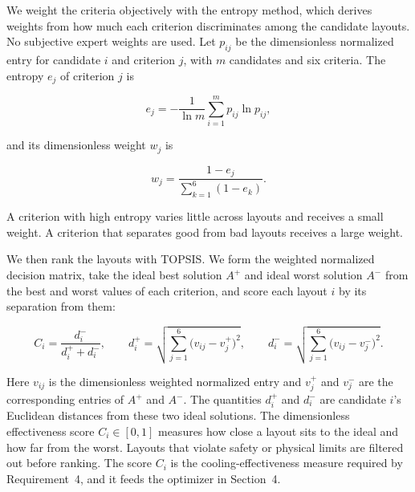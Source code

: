 \documentclass[11pt]{article}
\begin{document}
We weight the criteria objectively with the entropy method, which derives weights
from how much each criterion discriminates among the candidate layouts. No
subjective expert weights are used. Let $p_{ij}$ be the dimensionless normalized
entry for candidate $i$ and criterion $j$, with $m$ candidates and six criteria.
The entropy $e_j$ of criterion $j$ is

\begin{equation}
e_j = -\frac{1}{\ln m}\sum_{i=1}^{m} p_{ij}\ln p_{ij},
\label{eq:entropy}
\end{equation}

and its dimensionless weight $w_j$ is

\begin{equation}
w_j = \frac{1-e_j}{\sum_{k=1}^{6}(1-e_k)}.
\label{eq:weight}
\end{equation}

A criterion with high entropy varies little across layouts and receives a small
weight. A criterion that separates good from bad layouts receives a large weight.

We then rank the layouts with TOPSIS. We form the weighted normalized decision
matrix, take the ideal best solution $A^{+}$ and ideal worst solution $A^{-}$
from the best and worst values of each criterion, and score each layout $i$ by
its separation from them:

\begin{equation}
C_i = \frac{d_i^{-}}{d_i^{+}+d_i^{-}},
\qquad
d_i^{+}=\sqrt{\sum_{j=1}^{6}\bigl(v_{ij}-v_j^{+}\bigr)^2},
\qquad
d_i^{-}=\sqrt{\sum_{j=1}^{6}\bigl(v_{ij}-v_j^{-}\bigr)^2}.
\label{eq:topsis}
\end{equation}

Here $v_{ij}$ is the dimensionless weighted normalized entry and $v_j^{+}$ and
$v_j^{-}$ are the corresponding entries of $A^{+}$ and $A^{-}$. The quantities
$d_i^{+}$ and $d_i^{-}$ are candidate $i$'s Euclidean distances from these two
ideal solutions. The dimensionless effectiveness score $C_i\in[0,1]$ measures
how close a layout sits to the ideal and how far from the worst. Layouts that violate safety or physical limits are
filtered out before ranking. The score $C_i$ is the cooling-effectiveness measure
required by Requirement~4, and it feeds the optimizer in Section~4.

\end{document}

